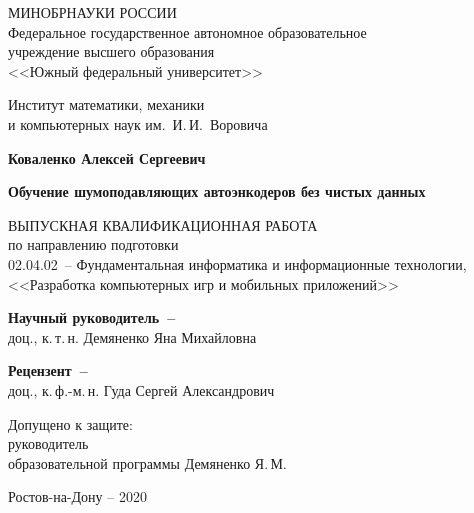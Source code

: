 


\thispagestyle{empty}
\begin{singlespacing} 
\begin{center}

МИНОБРНАУКИ РОССИИ\\ [12pt]
Федеральное государственное автономное образовательное\\
учреждение высшего образования\\
<<Южный федеральный университет>>

\vspace{\baselineskip}
Институт математики, механики\\
и компьютерных наук им.~И.\,И.~Воровича


\vfill
\textbf{Коваленко Алексей Сергеевич}

\vspace{15mm}
{\bf Обучение шумоподавляющих автоэнкодеров без чистых данных }

\vspace{15mm}
ВЫПУСКНАЯ КВАЛИФИКАЦИОННАЯ РАБОТА\\
по направлению подготовки\\
02.04.02~-- Фундаментальная информатика и информационные технологии,\\
<<Разработка компьютерных игр и мобильных приложений>>

\vspace{10mm}
\textbf{Научный руководитель~--}\\
 доц., к.\,т.\,н. Демяненко Яна Михайловна

\vspace{7mm}
\textbf{Рецензент~--}\\
доц., к.\,ф.-м.\,н. Гуда Сергей Александрович


\vspace{15mm}

\noindent
\begin{flushleft}
Допущено к защите:\\
руководитель \\
образовательной программы \underline{\hspace*{50mm}} Демяненко Я.\,М.
\end{flushleft}




\vfill
Ростов-на-Дону -- 2020

\end{center} 

\singlespacing
\end{singlespacing}